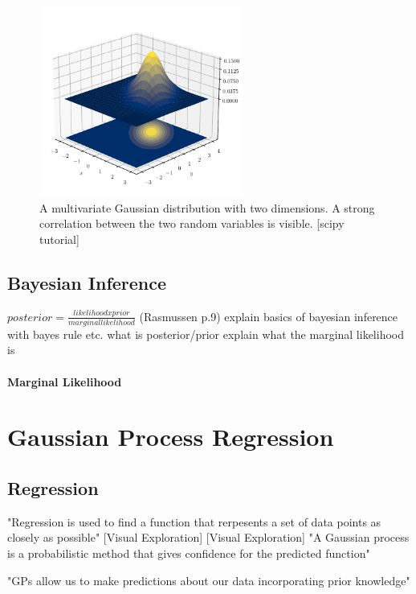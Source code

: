 \documentclass[%
  a4paper,oneside,%
  11pt,%
  smallchapters,
  green,%
  rgb, <cmyk>
  ,]{tubsbook}
\begin{document}
\begin{figure}[h]
\begin{center}
\includegraphics[width=0.6\textwidth]{pics/Gaussians}
\caption{A multivariate Gaussian distribution with two dimensions. A strong correlation between the two random variables is visible. [scipy tutorial] }
\label{fig:MultiGauss}
\end{center}
\end{figure}

\subsection{Bayesian Inference}
$posterior = \frac{likelihood x prior}{marginal likelihood}$ (Rasmussen p.9)
explain basics of bayesian inference with bayes rule etc. what is posterior/prior 
explain what the marginal likelihood is

\paragraph{Marginal Likelihood}


\section{Gaussian Process Regression}

\subsection{Regression}
"Regression is used to find a function that rerpesents a set of data points as closely as possible" [Visual Exploration]
[Visual Exploration] "A Gaussian process is a probabilistic method that gives confidence for the predicted function"

"GPs allow us to make predictions about our data incorporating prior knowledge"
\end{document}

